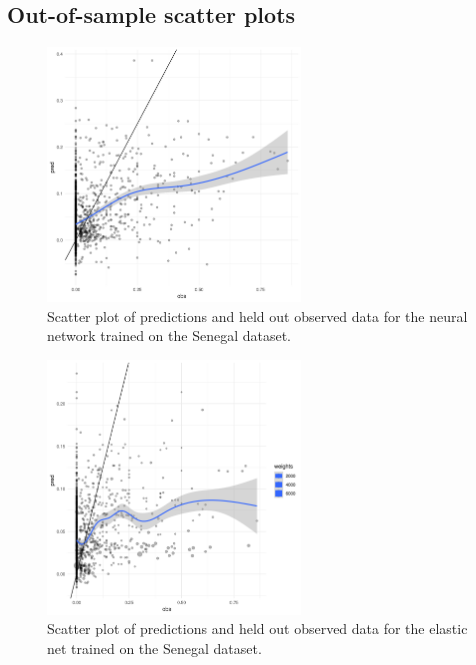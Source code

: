 \documentclass[review]{elsarticle}
\begin{document}
\clearpage
\subsection{Out-of-sample scatter plots}


\begin{figure}[h!]
  \centering
  \includegraphics[width=0.6\textwidth]{figs/SI/nnet_obspred_sen.png}
\caption{
  Scatter plot of predictions and held out observed data for the neural network trained on the Senegal dataset.
}

\end{figure}



\begin{figure}[h!]
  \centering
  \includegraphics[width=0.6\textwidth]{figs/SI/enet_obspred_sen.png}
\caption{
  Scatter plot of predictions and held out observed data for the elastic net trained on the Senegal dataset.
}

\end{figure}
\end{document}
